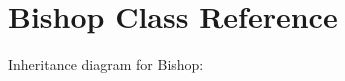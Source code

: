 \hypertarget{classBishop}{}\section{Bishop Class Reference}
\label{classBishop}


Inheritance diagram for Bishop\+:
